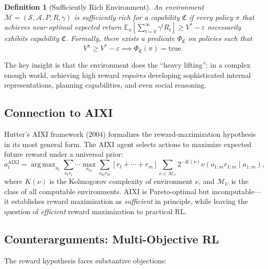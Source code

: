 \documentclass[11pt,a4paper]{article}
\newtheorem{definition}[theorem]{Definition}
\newcommand{\E}{\mathbb{E}}
\newcommand{\cS}{\mathcal{S}}
\newcommand{\cA}{\mathcal{A}}
\newcommand{\cM}{\mathcal{M}}
\DeclareMathOperator*{\argmax}{arg\,max}
\begin{document}
\begin{definition}[Sufficiently Rich Environment]
\label{def:rich-env}
An environment $\cM = (\cS, \cA, P, R, \gamma)$ is \emph{sufficiently rich} for a capability
$\mathfrak{C}$ if every policy $\pi$ that achieves near-optimal expected return
$\E_\pi[\sum_{t=0}^\infty \gamma^t R_t] \geq V^* - \varepsilon$ necessarily exhibits
capability $\mathfrak{C}$.  Formally, there exists a predicate $\Phi_{\mathfrak{C}}$
on policies such that
\[
  V^\pi \geq V^* - \varepsilon \implies \Phi_{\mathfrak{C}}(\pi) = \text{true}.
\]
\end{definition}

The key insight is that the environment does the ``heavy lifting'': in a complex
enough world, achieving high reward \emph{requires} developing sophisticated
internal representations, planning capabilities, and even social reasoning.

\subsection{Connection to AIXI}

Hutter's AIXI framework (2004) formalizes the reward-maximization hypothesis in
its most general form. The AIXI agent selects actions to maximize expected future
reward under a universal prior:
\[
  a_t^{\text{AIXI}} = \argmax_{a_t} \sum_{o_t r_t} \cdots \max_{a_m} \sum_{o_m r_m}
    [r_t + \cdots + r_m] \sum_{\nu \in \cM_U} 2^{-K(\nu)} \nu(o_{1:m} r_{1:m} \mid a_{1:m}),
\]
where $K(\nu)$ is the Kolmogorov complexity of environment $\nu$, and $\cM_U$
is the class of all computable environments. AIXI is Pareto-optimal but
incomputable---it establishes reward maximization as \emph{sufficient} in
principle, while leaving the question of \emph{efficient} reward maximization
to practical RL.

\subsection{Counterarguments: Multi-Objective RL}

The reward hypothesis faces substantive objections:
\end{document}
